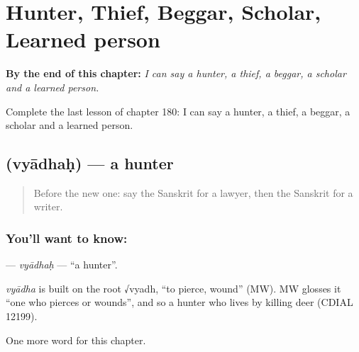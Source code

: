 
\chapter{Hunter, Thief, Beggar, Scholar, Learned person}
\label{ch:sa-hunter-thief-beggar-scholar-learned-person}

\begin{chapteropening}
\textbf{By the end of this chapter:} \emph{I can say a hunter, a thief, a beggar, a scholar and a learned person.}

Complete the last lesson of chapter 180: I can say a hunter, a thief, a beggar, a scholar and a learned person.
\end{chapteropening}

\section[\texorpdfstring{\sk{व्याधः} (vyādhaḥ)}{व्याधः (vyādhaḥ)}]{ (vyādhaḥ) — a hunter}

\label{lesson:SA-C180-vyadhah}



\begin{quote}
Before the new one: say the Sanskrit for a lawyer, then the Sanskrit for a writer.
\end{quote}

\subsection*{You'll want to know: }
\textbf{} — \emph{vyādhaḥ} — \textquotedblleft{}a hunter\textquotedblright{}.

\begin{cousinweb}
\emph{vyādha} is built on the root √vyadh, \textquotedblleft{}to pierce, wound\textquotedblright{} (MW). MW glosses it \textquotedblleft{}one who pierces or wounds\textquotedblright{}, and so a hunter who lives by killing deer (CDIAL 12199).
\end{cousinweb}

\begin{grammarlens}[title={What you've built}]
One more word for this chapter.
\end{grammarlens}

